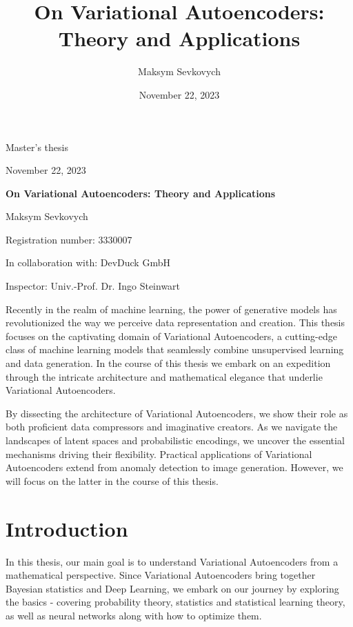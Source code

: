 \documentclass[11pt, twoside, a4paper]{book}
\title{On Variational Autoencoders: Theory and Applications}
\date{November 22, 2023}
\author{Maksym Sevkovych}
\theoremstyle{plain}
\theoremstyle{definition}
\theoremstyle{plain}
\begin{document}
\begin{titlepage}
\vspace*{1 cm}
\begin{center}
\LARGE{Master's thesis}

\vspace{0.5 cm}

\large{November 22, 2023}

\vspace{0.5 cm}

\Huge{\textbf{On Variational Autoencoders: Theory and Applications}}

\vspace{0.5 cm}

\Large{Maksym Sevkovych}

\Large{Registration number: 3330007}

\Large{In collaboration with: DevDuck GmbH}
\vspace{1 cm}

\Large{Inspector: Univ.-Prof. Dr. Ingo Steinwart}
\vspace{3cm}
\end{center}
Recently in the realm of machine learning, the power of generative models has revolutionized the way we perceive data representation and creation. This thesis focuses on the captivating domain of Variational Autoencoders, a cutting-edge class of machine learning models that seamlessly combine unsupervised learning and data generation. In the course of this thesis we embark on an expedition through the intricate architecture and mathematical elegance that underlie Variational Autoencoders.

By dissecting the architecture of Variational Autoencoders, we show their role as both proficient data compressors and imaginative creators. As we navigate the landscapes of latent spaces and probabilistic encodings, we uncover the essential mechanisms driving their flexibility.
Practical applications of Variational Autoencoders extend from anomaly detection to image generation. However, we will focus on the latter in the course of this thesis.
\end{titlepage}
\newpage
\tableofcontents
\newpage
{}
\section*{Introduction}
In this thesis, our main goal is to understand Variational Autoencoders from a mathematical perspective. Since Variational Autoencoders bring together Bayesian statistics and Deep Learning, we embark on our journey by exploring the basics - covering probability theory, statistics and statistical learning theory, as well as neural networks along with how to optimize them.
\end{document}
